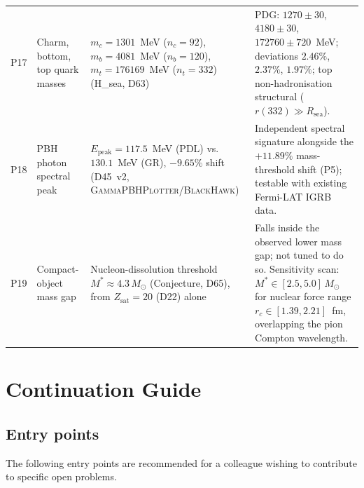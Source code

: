 \documentclass[11pt,a4paper]{article}
\theoremstyle{plain}
\theoremstyle{definition}
\theoremstyle{remark}
\newcommand{\Zsat}{Z_{\mathrm{sat}}}
\begin{document}
\begin{longtable}{L{0.5cm}L{3.2cm}L{5.2cm}L{4.2cm}}
P17 & Charm, bottom, top quark masses & $m_c = 1301$~MeV ($n_c=92$), $m_b = 4081$~MeV ($n_b=120$), $m_t = 176169$~MeV ($n_t=332$) (H\_sea, D63) & PDG: $1270 \pm 30$, $4180 \pm 30$, $172760 \pm 720$~MeV; deviations $2.46\%$, $2.37\%$, $1.97\%$; top non-hadronisation structural ($r(332) \gg R_{\mathrm{sea}}$).\\[0.4em]
P18 & PBH photon spectral peak & $E_{\mathrm{peak}}=117.5$~MeV (PDL) vs.\ $130.1$~MeV (GR), $-9.65\%$ shift (D45~v2, \textsc{GammaPBHPlotter}/\textsc{BlackHawk}) & Independent spectral signature alongside the $+11.89\%$ mass-threshold shift (P5); testable with existing Fermi-LAT IGRB data.\\[0.4em]
P19 & Compact-object mass gap & Nucleon-dissolution threshold $M^*\approx4.3\,M_\odot$ (Conjecture, D65), from $\Zsat=20$ (D22) alone & Falls inside the observed lower mass gap; not tuned to do so. Sensitivity scan: $M^*\in[2.5,5.0]\,M_\odot$ for nuclear force range $r_c\in[1.39,2.21]$~fm, overlapping the pion Compton wavelength.\\[0.4em]
\end{longtable}

\section{Continuation Guide}
\label{sec:continuation}

\subsection{Entry points}
\label{subsec:entrypoints}
The following entry points are recommended for a colleague wishing to contribute to specific open problems.
\end{document}
